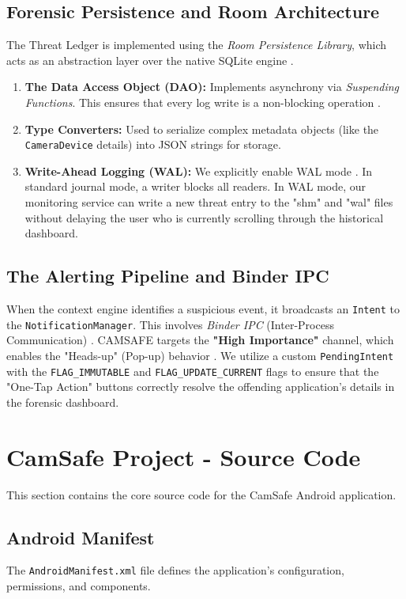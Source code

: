 \documentclass[12pt,a4paper]{report}
\begin{document}
\begin{enumerate}
\begin{itemize}
    \subsection{Forensic Persistence and Room Architecture}
    The Threat Ledger is implemented using the \textit{Room Persistence Library}, which acts as an abstraction layer over the native SQLite engine \cite{smarthome}.
    \begin{enumerate}
        \item \textbf{The Data Access Object (DAO):} Implements asynchrony via \textit{Suspending Functions}. This ensures that every log write is a non-blocking operation \cite{smarthome}.
        \item \textbf{Type Converters:} Used to serialize complex metadata objects (like the \texttt{CameraDevice} details) into JSON strings for storage.
        \item \textbf{Write-Ahead Logging (WAL):} We explicitly enable WAL mode \cite{smarthome}. In standard journal mode, a writer blocks all readers. In WAL mode, our monitoring service can write a new threat entry to the "shm" and "wal" files without delaying the user who is currently scrolling through the historical dashboard.
    \end{enumerate}

    \subsection{The Alerting Pipeline and Binder IPC}
    When the context engine identifies a suspicious event, it broadcasts an \texttt{Intent} to the \texttt{NotificationManager}. This involves \textit{Binder IPC} (Inter-Process Communication) \cite{androidhal}. CAMSAFE targets the \textbf{"High Importance"} channel, which enables the "Heads-up" (Pop-up) behavior \cite{privacydot}. We utilize a custom \texttt{PendingIntent} with the \texttt{FLAG\_IMMUTABLE} and \texttt{FLAG\_UPDATE\_CURRENT} flags to ensure that the "One-Tap Action" buttons correctly resolve the offending application's details in the forensic dashboard.
    \section{CamSafe Project - Source Code}
    This section contains the core source code for the CamSafe Android application. 

    \subsection{Android Manifest}
    The \texttt{AndroidManifest.xml} file defines the application's configuration, permissions, and components.


\end{itemize}
\end{enumerate}
\end{document}
